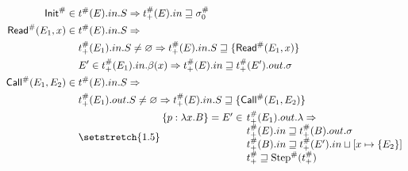 \begin{align*}
  \Abs\InitE\in{}          & \Abs\ptree(E).\abbrtext{in}.\event\Rightarrow\Abs\ptree_+(E).\abbrtext{in}\sqsupseteq\Abs\ctx_0                                         \\
  \Abs\ReadE(E_1,x)\in{}   & \Abs\ptree(E).\abbrtext{in}.\event\Rightarrow                                                                                           \\
                           & \Abs\ptree_+(E_1).\abbrtext{in}.\event\neq\varnothing\Rightarrow\Abs\ptree_+(E).\abbrtext{in}.\event\sqsupseteq\{\Abs\ReadE(E_1,x)\}    \\
                           & E'\in\Abs\ptree_+(E_1).\abbrtext{in}.\beta(x)\Rightarrow\Abs\ptree_+(E).\abbrtext{in}\sqsupseteq\Abs\ptree_+(E').\abbrtext{out}.\ctx    \\
  \Abs\CallE(E_1,E_2)\in{} & \Abs\ptree(E).\abbrtext{in}.\event\Rightarrow                                                                                           \\
                           & \Abs\ptree_+(E_1).\abbrtext{out}.\event\neq\varnothing\Rightarrow\Abs\ptree_+(E).\abbrtext{in}.\event\sqsupseteq\{\Abs\CallE(E_1,E_2)\} \\
                           & {\setlength{\arraycolsep}{2pt}\setstretch{1.5}
      \begin{array}{rl}
        \{p:\lambda x.B\}=E'\in & \Abs\ptree_+(E_1).\abbrtext{out}.\lambda\Rightarrow                                           \\
                                & \Abs\ptree_+(E).\abbrtext{in}\sqsupseteq\Abs\ptree_+(B).\abbrtext{out}.\ctx                   \\
                                & \Abs\ptree_+(B).\abbrtext{in}\sqsupseteq\Abs\ptree_+(E').\abbrtext{in}\sqcup[x\mapsto\{E_2\}] \\
                                & \Abs\ptree_+\sqsupseteq\Abs\Step(\Abs\ptree_+)
      \end{array}}
\end{align*}
